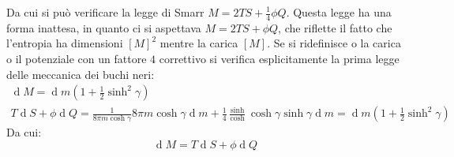 \documentclass[]{scrartcl}
\newcommand{\pd}{\partial}
\renewcommand{\d}[1]{\ensuremath{\operatorname{d}\!{#1}}}
\begin{document}
Da cui si può verificare la legge di Smarr $ M = 2 TS + \frac{1}{4}\phi Q $. Questa legge ha una forma inattesa, in quanto
ci si aspettava $ M = 2 TS + \phi Q $, che riflette il fatto che l'entropia ha dimensioni $ [M]^2 $ mentre la carica $ [M] $.
Se si ridefinisce o la carica o il potenziale con un fattore $ 4 $ correttivo si verifica esplicitamente la prima
legge delle meccanica dei buchi neri: %
\begin{gather*}
  \d M  = \d m \left( 1 + \frac{1}{2}\sinh^2\gamma \right) \\
  T \d S + \phi \d  Q  = \frac{1}{8 \pi m \cosh \gamma} 8 \pi m \cosh \gamma \d m +  \frac{1}{4} \frac{\sinh}{\cosh} \cosh \gamma \sinh \gamma \d m  = \d m \left( 1 + \frac{1}{2}\sinh^2\gamma \right)
\end{gather*}
Da cui:
\[
  \d M = T \d S + \phi \d Q
\]

\end{document}
